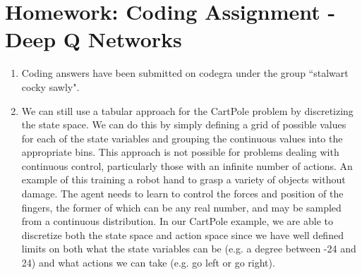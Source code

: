 \documentclass{article}
\begin{document}
\section*{Homework: Coding Assignment - Deep Q Networks}
\begin{enumerate}
	\item Coding answers have been submitted on codegra under the group ``stalwart cocky sawly".
	\item We can still use a tabular approach for the CartPole problem by discretizing the state
	      space. We can do this by simply defining a grid of possible values for each of the state
	      variables and grouping the continuous values into the appropriate bins. This approach is not
	      possible for problems dealing with continuous control, particularly those with an infinite
	      number of actions. An example of this training a robot hand to grasp a variety of objects
	      without damage. The agent needs to learn to control the forces and position of the fingers, the
	      former of which can be any real number, and may be sampled from a continuous distribution. In
	      our CartPole example, we are able to discretize both the state space and action space since we
	      have well defined limits on both what the state variables can be (e.g. a degree between -24 and
	      24) and what actions we can take (e.g. go left or go right).
\end{enumerate}
\end{document}
